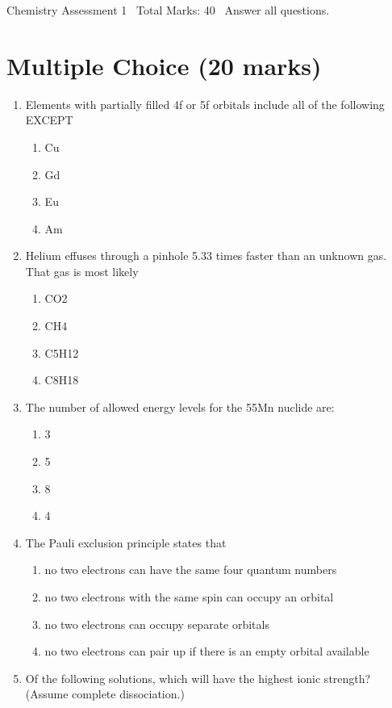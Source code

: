 \documentclass[12pt]{article}
\begin{document}
\begin{center}
Chemistry Assessment 1 \
Total Marks: 40 \
Answer all questions.
\end{center}

\section*{Multiple Choice (20 marks)}
\begin{enumerate}[label=\arabic*.]
\item Elements with partially filled 4f or 5f orbitals include all of the following EXCEPT
\begin{enumerate}[label=(\alph*)]
    \item Cu
    \item Gd
    \item Eu
    \item Am
\end{enumerate}
\item Helium effuses through a pinhole 5.33 times faster than an unknown gas. That gas is most likely
\begin{enumerate}[label=(\alph*)]
    \item CO2
    \item CH4
    \item C5H12
    \item C8H18
\end{enumerate}
\item The number of allowed energy levels for the 55Mn nuclide are:
\begin{enumerate}[label=(\alph*)]
    \item 3
    \item 5
    \item 8
    \item 4
\end{enumerate}
\item The Pauli exclusion principle states that
\begin{enumerate}[label=(\alph*)]
    \item no two electrons can have the same four quantum numbers
    \item no two electrons with the same spin can occupy an orbital
    \item no two electrons can occupy separate orbitals
    \item no two electrons can pair up if there is an empty orbital available
\end{enumerate}
\item Of the following solutions, which will have the highest ionic strength? (Assume complete dissociation.)

\end{enumerate}
\end{document}
